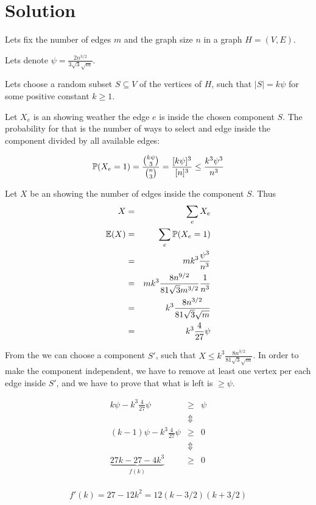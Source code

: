 \documentclass[a4paper]{article}
\begin{document}
\section{Solution}

Lets fix the number of edges $ m $ and the graph size $ n $ in a graph $ H = (V, E) $.

Lets denote $ \psi = \frac{2n^{3/2}}{3\sqrt{3}\sqrt{m}} $.

Lets choose a random subset $ S \subseteq V $ of the vertices of $ H $, such
that $ |S| = k\psi $ for some positive constant $ k \ge 1 $.

Let $ X_e $ is an \irv showing weather the edge $ e $ is inside the chosen component $ S $. The probability for that is the number of ways to select and edge inside the component divided by all available edges:

$$
  \P(X_e = 1) = \frac{\binom{k\psi}{3}}{\binom{n}{3}} = \frac{[k\psi]^3}{[n]^3} \le \frac{k^3\psi^3}{n^3}
$$

Let $ X $ be an \rv showing the number of edges inside the component $ S $. Thus
\begin{eqnarray*}
  X &=& \sum_e X_e \\
  \E(X) &=& \sum_e \P(X_e = 1) \\
    &=& mk^3\frac{\psi^3}{n^3} \\
    &=& mk^3\frac{8n^{9/2}}{81\sqrt{3}m^{3/2}}\frac{1}{n^3} \\
    &=& k^3 \frac{8n^{3/2}}{81\sqrt{3}\sqrt{m}} \\
    &=& k^3 \frac{4}{27} \psi \\
\end{eqnarray*}

From the \FMM we can choose a component $ S' $, such that $ X \le k^3
\frac{8n^{3/2}}{81\sqrt{3}\sqrt{m}} $. In order to make the component independent, we have to remove at least one vertex per each edge inside $ S' $, and we have to prove that what is left is $ \ge \psi $.

\begin{eqnarray*}
  k\psi - k^3 \frac{4}{27} \psi &\ge& \psi \\
  &\Updownarrow& \\
  (k-1)\psi - k^3 \frac{4}{27} \psi &\ge& 0 \\
  &\Updownarrow& \\
  \underbrace{27k - 27 - 4k^3}_{f(k)} &\ge& 0 \\
\end{eqnarray*}

$$
  f'(k) = 27 - 12k^2 = 12(k - 3/2)(k + 3/2)
$$
\end{document}
